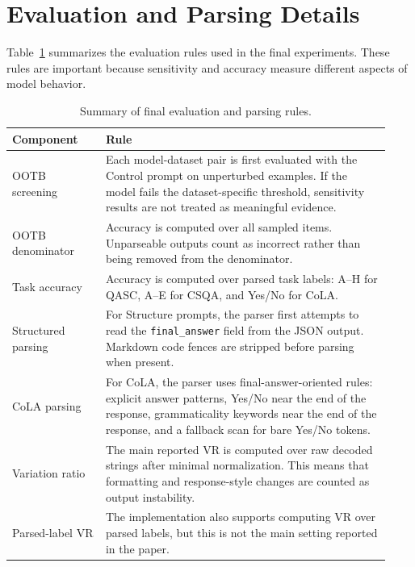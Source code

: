 \documentclass[11pt]{article}
\begin{document}
\clearpage
\section{Evaluation and Parsing Details}
\label{app:evaluation-details}

Table~\ref{tab:app-eval-rules} summarizes the evaluation rules used in the final experiments. These rules are important because sensitivity and accuracy measure different aspects of model behavior.

\begin{table}[h]
\centering
\small
\setlength{\tabcolsep}{5pt}
\begin{tabular}{p{0.23\linewidth}p{0.70\linewidth}}
\toprule
Component & Rule \\
\midrule
OOTB screening &
Each model-dataset pair is first evaluated with the Control prompt on unperturbed examples. If the model fails the dataset-specific threshold, sensitivity results are not treated as meaningful evidence. \\

OOTB denominator &
Accuracy is computed over all sampled items. Unparseable outputs count as incorrect rather than being removed from the denominator. \\

Task accuracy &
Accuracy is computed over parsed task labels: A--H for QASC, A--E for CSQA, and Yes/No for CoLA. \\

Structured parsing &
For Structure prompts, the parser first attempts to read the \texttt{final\_answer} field from the JSON output. Markdown code fences are stripped before parsing when present. \\

CoLA parsing &
For CoLA, the parser uses final-answer-oriented rules: explicit answer patterns, Yes/No near the end of the response, grammaticality keywords near the end of the response, and a fallback scan for bare Yes/No tokens. \\

Variation ratio &
The main reported VR is computed over raw decoded strings after minimal normalization. This means that formatting and response-style changes are counted as output instability. \\

Parsed-label VR &
The implementation also supports computing VR over parsed labels, but this is not the main setting reported in the paper. \\
\bottomrule
\end{tabular}
\caption{Summary of final evaluation and parsing rules.}
\label{tab:app-eval-rules}
\end{table}
\end{document}
